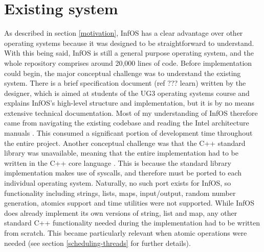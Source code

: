 \documentclass[bsc,frontabs,twoside,singlespacing,parskip,deptreport]{infthesis}     %
\begin{document}
\section{Existing system} \label{existing-system}
As described in section \ref{motivation}, InfOS has a clear advantage over other operating systems because it was designed to be straightforward to understand. With this being said, InfOS is still a general purpose operating system, and the whole repository comprises around 20,000 lines of code. Before implementation could begin, the major conceptual challenge was to understand the existing system. There is a brief specification document (ref ??? learn) written by the designer, which is aimed at students of the UG3 operating systems course and explains InfOS’s high-level structure and implementation, but it is by no means extensive technical documentation. Most of my understanding of InfOS therefore came from navigating the existing codebase and reading the Intel architecture manuals \cite{intel-full-manual}. This consumed a significant portion of development time throughout the entire project. Another conceptual challenge was that the C++ standard library was unavailable, meaning that the entire implementation had to be written in the C++ core language \cite{cpp-core}. This is because the standard library implementation makes use of syscalls, and therefore must be ported to each individual operating system. Naturally, no such port exists for InfOS, so functionality including strings, lists, maps, input/output, random number generation, atomics support and time utilities were not supported. While InfOS does already implement its own versions of string, list and map, any other standard C++ functionality needed during the implementation had to be written from scratch. This became particularly relevant when atomic operations were needed (see section \ref{scheduling-threads} for further details).
 
\end{document}
